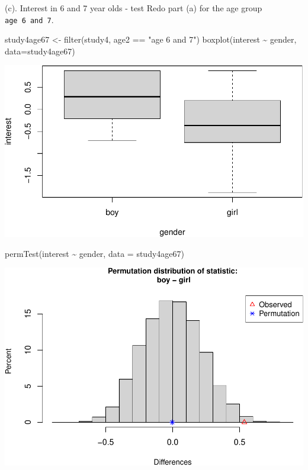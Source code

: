 \documentclass[
]{book}
\newenvironment{Shaded}{\begin{snugshade}}{\end{snugshade}}
\newcommand{\AttributeTok}[1]{\textcolor[rgb]{0.77,0.63,0.00}{#1}}
\newcommand{\FunctionTok}[1]{\textcolor[rgb]{0.00,0.00,0.00}{#1}}
\newcommand{\NormalTok}[1]{#1}
\newcommand{\OtherTok}[1]{\textcolor[rgb]{0.56,0.35,0.01}{#1}}
\newcommand{\SpecialCharTok}[1]{\textcolor[rgb]{0.00,0.00,0.00}{#1}}
\newcommand{\StringTok}[1]{\textcolor[rgb]{0.31,0.60,0.02}{#1}}
\begin{document}
\vspace*{1in}

(c). Interest in 6 and 7 year olds - test
Redo part (a) for the age group \texttt{age\ 6\ and\ 7}.

\begin{Shaded}
\begin{Highlighting}[]
\NormalTok{study4age67 }\OtherTok{\textless{}{-}} \FunctionTok{filter}\NormalTok{(study4, age2 }\SpecialCharTok{==} \StringTok{"age 6 and 7"}\NormalTok{)}
\FunctionTok{boxplot}\NormalTok{(interest }\SpecialCharTok{\textasciitilde{}}\NormalTok{ gender, }\AttributeTok{data=}\NormalTok{study4age67)}
\end{Highlighting}
\end{Shaded}

\includegraphics[width=1\linewidth]{Class_Activity_13_files/figure-latex/unnamed-chunk-7-1}

\begin{Shaded}
\begin{Highlighting}[]
\FunctionTok{permTest}\NormalTok{(interest }\SpecialCharTok{\textasciitilde{}}\NormalTok{ gender, }\AttributeTok{data =}\NormalTok{ study4age67)}
\end{Highlighting}
\end{Shaded}

\includegraphics[width=1\linewidth]{Class_Activity_13_files/figure-latex/unnamed-chunk-7-2}
\end{document}
